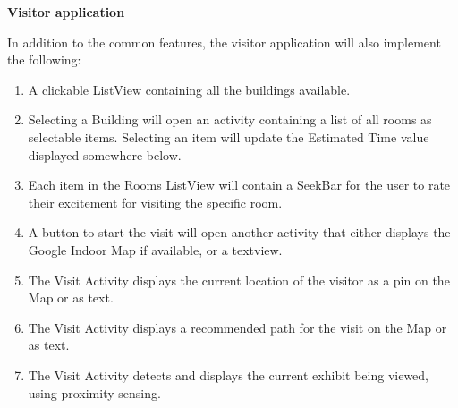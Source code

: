 \noindent \textbf{Visitor application}

In addition to the common features, the visitor application will also implement the following:
\begin{enumerate}
\item A clickable ListView containing all the buildings available.
\item Selecting a Building will open an activity containing a list of all rooms as selectable items. Selecting an item will update the Estimated Time value displayed somewhere below.
\item Each item in the Rooms ListView will contain a SeekBar for the user to rate their excitement for visiting the specific room.
\item A button to start the visit will open another activity that either displays the Google Indoor Map if available, or a textview.
\item The Visit Activity displays the current location of the visitor as a pin on the Map or as text.
\item The Visit Activity displays a recommended path for the visit on the Map or as text.
\item The Visit Activity detects and displays the current exhibit being viewed, using proximity sensing.
\end{enumerate}

